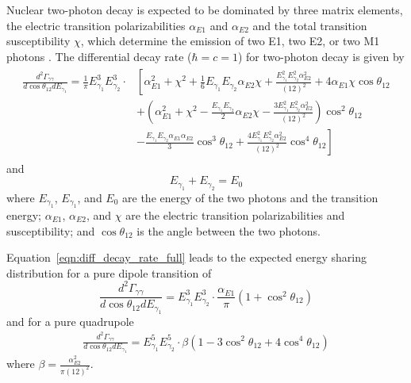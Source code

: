 \documentclass[cnatzke_thesis_proposal.tex]{subfiles}
\begin{document}
Nuclear two-photon decay is expected to be dominated by three matrix elements, the electric transition polarizabilities $\alpha_{E1}$ and $\alpha_{E2}$ and the total transition susceptibility $\chi$, which determine the emission of two E1, two E2, or two M1 photons \cite{kramp_nuclear_1987}.
The differential decay rate ($\hbar = c = 1$) for two-photon decay is given by 
\begin{align} \label{eqn:diff_decay_rate_full}
    \begin{split}
    \frac{d^2\Gamma_{\gamma\gamma}}{d \cos\theta_{12} dE_{\gamma_1}} = \frac{1}{\pi} E_{\gamma_1}^3 E_{\gamma_2}^3 \cdot & \left[ \alpha^2_{E1} + \chi^2 + \frac{1}{6} E_{\gamma_1} E_{\gamma_2} \alpha_{E2} \chi + \frac{E_{\gamma_1}^2 E_{\gamma_2}^2 \alpha_{E2}^2}{(12)^2} + 4 \alpha_{E1} \chi \cos\theta_{12} \right. \\ 
    &\left. + \left(\alpha_{E1}^2 + \chi^2 - \frac{E_{\gamma_1} E_{\gamma_2}}{2} \alpha_{E2} \chi - \frac{3 E_{\gamma_1}^2 E_{\gamma_2}^2 \alpha_{E2}^2}{(12)^2}\right) \cos^2\theta_{12} \right. \\
    &\left. - \frac{E_{\gamma_1} E_{\gamma_2} \alpha_{E1} \alpha_{E2}}{3} \cos^3\theta_{12} + \frac{4 E_{\gamma_1}^2 E_{\gamma_2}^2 \alpha_{E2}^2}{(12)^2} \cos^4\theta_{12} \right]
    \end{split}
\end{align}
and     
\begin{equation} \label{eqn:two_photon_energy_sum}
    E_{\gamma_1} + E_{\gamma_2} = E_0
\end{equation}
where $E_{\gamma_1}$, $E_{\gamma_1}$, and $E_{0}$ are the energy of the two photons and the transition energy; $\alpha_{E1}$, $\alpha_{E2}$, and $\chi$ are the electric transition polarizabilities and susceptibility; and $\cos\theta_{12}$ is the angle between the two photons. 

Equation~\ref{eqn:diff_decay_rate_full} leads to the expected energy sharing distribution for a pure dipole transition of 
\begin{equation}
    \frac{d^2\Gamma_{\gamma\gamma}}{d \cos\theta_{12} dE_{\gamma_1}} =  E_{\gamma_1}^3 E_{\gamma_2}^3 \cdot \frac{\alpha_{E1}}{\pi} \left( 1 + \cos^2\theta_{12} \right)
\end{equation}
and for a pure quadrupole
\begin{align}
    \frac{d^2\Gamma_{\gamma\gamma}}{d \cos\theta_{12} dE_{\gamma_1}} = E_{\gamma_1}^5 E_{\gamma_2}^5 \cdot \beta \left( 1 - 3 \cos^2\theta_{12} + 4 \cos^4 \theta_{12} \right) 
\end{align}
where $\beta = \frac{\alpha_{E2}^2}{\pi (12)^2}$.
\end{document}
